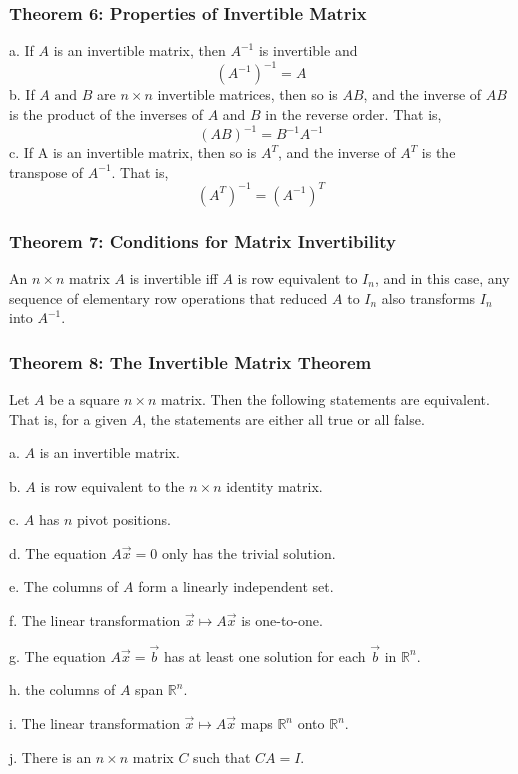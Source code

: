 \documentclass{article}
\begin{document}
\subsubsection*{Theorem 6: Properties of Invertible Matrix}

a. If $A$ is an invertible matrix, then $A ^{-1}$ is invertible and
$$(A^{-1})^{-1} = A$$
b. If $A \text{ and } B$ are $n \times n$ invertible matrices, then so is $AB$, and the inverse of $AB$ is the product of the inverses of $A$ and $B$ in the reverse order. That is, 
$$(AB)^{-1} = B^{-1}A^{-1}$$
c. If A is an invertible matrix, then so is $A^T$, and the inverse of $A^T$ is the transpose of $A^{-1}$. That is, 
$$(A^T)^{-1} = (A^{-1})^T$$

\subsubsection*{Theorem 7: Conditions for Matrix Invertibility}
An $n \times n$ matrix $A$ is invertible iff $A$ is row equivalent to $I_n$, and in this case, any sequence of elementary row operations that reduced $A$ to $I_n$ also transforms $I_n$ into $A^{-1}$. 

\subsubsection*{Theorem 8: The Invertible Matrix Theorem}
Let $A$ be a square $n \times n$ matrix. Then the following statements are equivalent. That is, for a given $A$, the statements are either all true or all false.

a. $A$ is an invertible matrix.

b. $A$ is row equivalent to the $n \times n$ identity matrix. 

c. $A$ has $n$ pivot positions.

d. The equation $A \vec x = 0$ only has the trivial solution. 

e. The columns of $A$ form a linearly independent set. 

f. The linear transformation $\vec x \mapsto A \vec x$ is one-to-one. 

g. The equation $A \vec x = \vec b$ has at least one solution for each $\vec b$ in $\mathbb{R}^n$.

h. the columns of $A$ span $\mathbb{R}^n$. 

i. The linear transformation $\vec x \mapsto A \vec x$ maps $\mathbb{R}^n$ onto $\mathbb{R}^n$. 

j. There is an $n \times n$ matrix $C$ such that $CA = I$. 
\end{document}
